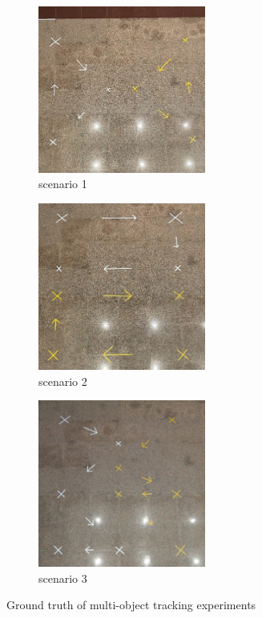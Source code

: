\begin{figure}[!htb]
    \centering
    \begin{subfigure}{0.25\linewidth}
        \includegraphics[width=5.5cm]{Figures/scenario_1_gt.png}
        \caption{scenario 1}
        \label{subfig:scenario1gt}
    \end{subfigure}
    \hfill
    \begin{subfigure}{0.25\linewidth}
        \centering
        \includegraphics[width=5.5cm]{Figures/scenario_2_gt.png}
        \caption{scenario 2}
        \label{subfig:scenario2gt}
    \end{subfigure}
    \hfill
    \begin{subfigure}{0.25\linewidth}
        \centering
        \includegraphics[width=5.5cm]{Figures/scenario_3_gt.jpg}
        \caption{scenario 3}
        \label{subfig:scenario3gt}
    \end{subfigure}

    \caption{Ground truth of multi-object tracking experiments}
    \label{fig:ground_truth}
\end{figure}

